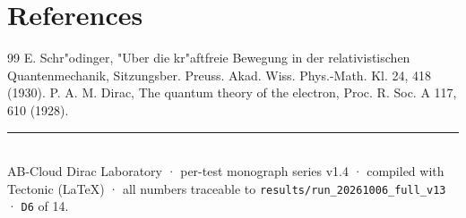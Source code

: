 \documentclass[11pt,a4paper]{article}
\begin{document}
\section*{References}
\begin{thebibliography}{99}\small
{} E. Schr"odinger, "Uber die kr"aftfreie Bewegung in der relativistischen Quantenmechanik, Sitzungsber. Preuss. Akad. Wiss. Phys.-Math. Kl. 24, 418 (1930).
 P. A. M. Dirac, The quantum theory of the electron, Proc. R. Soc. A 117, 610 (1928).
\end{thebibliography}

\vfill
\noindent\rule{\textwidth}{0.4pt}\\[0.2em]
{\footnotesize\color{labgray} AB-Cloud Dirac Laboratory · per-test monograph series v1.4 · compiled with Tectonic (LaTeX) · all numbers traceable to \texttt{results/run\_20261006\_full\_v13} · \texttt{D6} of 14.}
\end{document}
